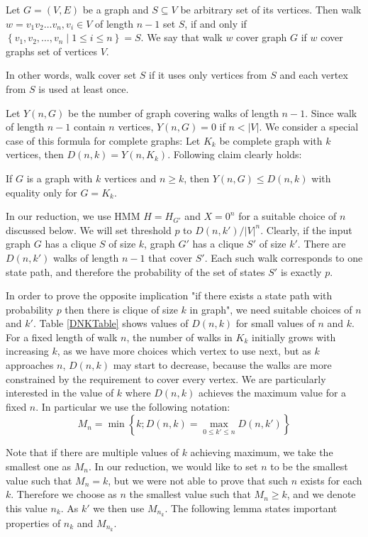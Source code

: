 \begin{definition}
Let $G=(V, E)$ be a graph and $S\subseteq V$ be arbitrary set of its vertices.
Then walk $w=v_1v_2\dots v_n, v_i\in V$ of length $n-1$  set
$S$, if and only if $\left\{v_1, v_2, \dots, v_n\mid 1\leq i\leq n\right\}=S$. 
We say that walk $w$ cover graph $G$ if $w$ cover graphs set of vertices $V$.

In other words, walk cover set $S$ if it uses only vertices from $S$ and each
vertex from $S$ is used at least once.
\end{definition}

Let $Y(n, G)$ be the number of graph covering walks of length $n-1$. Since walk
of length $n - 1$ contain $n$ vertices, $Y(n, G)=0$ if $n<|V|$. We consider a
special case of this formula for complete graphs: Let $K_k$ be
complete graph with $k$ vertices, then $D(n, k) = Y(n, K_k)$. Following claim
clearly holds:

\begin{lemma}\label{NotCliqueIsSmaller}
If $G$ is a graph with $k$ vertices and $n\ge k$, then
$Y(n,G)\le D(n,k)$ with equality only for $G=K_k$. 
\end{lemma}

In our reduction, we use HMM $H=H_{G'}$ and $X=0^n$ for a suitable
choice of $n$ discussed below. We will set threshold $p$ to
$D(n,k')/|V|^{n}$. Clearly, if the input graph $G$ has a clique $S$ of
size $k$, graph $G'$ has a clique $S'$ of size $k'$. There
are $D(n,k')$ walks of length $n-1$ that cover $S'$. Each such walk
corresponds to one state path, and therefore the probability of
the set of states $S'$ is exactly $p$. 

In order to prove the opposite implication "if there exists a state path with
probability $p$ then there is clique of size $k$ in graph", we need suitable choices
of $n$ and $k'$. Table \ref{DNKTable} shows values of $D(n,k)$ for
small values of $n$ and $k$. For a fixed length of walk $n$, the
number of walks in $K_k$ initially grows with increasing $k$, as we
have more choices which vertex to use next, but as $k$ approaches $n$,
$D(n,k)$  may start to decrease, because the walks are more constrained by
the requirement to cover every vertex. We are particularly interested in
the value of $k$ where $D(n,k)$ achieves the maximum value for a fixed $n$. 
In particular we use the following notation:
$$M_{n} = \min\left\{k ; D(n,k) = \max_{0\leq k'\leq
  n}D(n,k')\right\}$$
  
Note that if there are multiple values
of $k$ achieving maximum, we take the smallest one as $M_n$.  In our
reduction, we would like to set $n$ to be the smallest value such that
$M_n=k$, but we were not able to prove that such $n$ exists for each $k$.
Therefore we choose as $n$ the smallest value such that $M_n\ge k$, and 
we denote this value $n_k$. As $k'$ we then use $M_{n_k}$. The following 
lemma states important properties of $n_k$ and $M_{n_k}$. 

